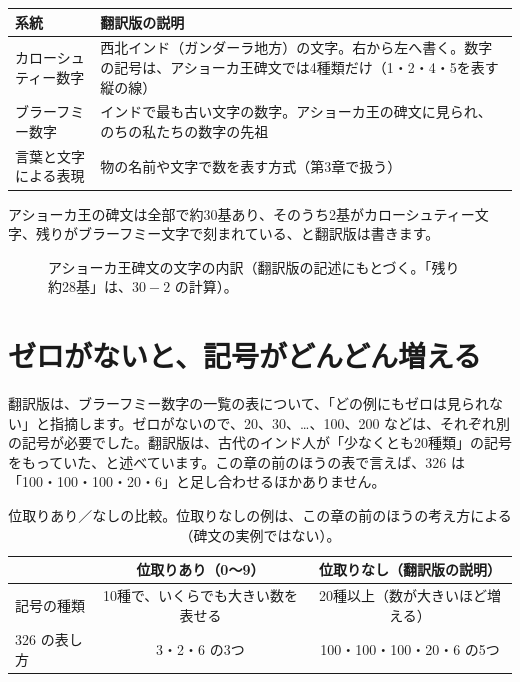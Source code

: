 \documentclass[a4paper,11pt,openany]{ltjsbook}
\begin{document}
\begin{center}
\begin{tabular}{lp{7.2cm}}
\toprule
系統 & 翻訳版の説明\\
\midrule
カローシュティー数字 & 西北インド（ガンダーラ地方）の文字。右から左へ書く。数字の記号は、アショーカ王碑文では4種類だけ（1・2・4・5を表す縦の線）\\
ブラーフミー数字 & インドで最も古い文字の数字。アショーカ王の碑文に見られ、のちの私たちの数字の先祖\\
言葉と文字による表現 & 物の名前や文字で数を表す方式（第3章で扱う）\\
\bottomrule
\end{tabular}
\end{center}

アショーカ王の碑文は全部で約30基あり、そのうち2基がカローシュティー文字、残りがブラーフミー文字で刻まれている、と翻訳版は書きます。

\begin{figure}[htbp]
\centering
{}
\caption{アショーカ王碑文の文字の内訳（翻訳版の記述にもとづく。「残り約28基」は、$30-2$ の計算）。}
\end{figure}

\section{ゼロがないと、記号がどんどん増える}

翻訳版は、ブラーフミー数字の一覧の表について、「どの例にもゼロは見られない」と指摘します。ゼロがないので、20、30、…、100、200 などは、それぞれ別の記号が必要でした。翻訳版は、古代のインド人が「少なくとも20種類」の記号をもっていた、と述べています。この章の前のほうの表で言えば、$326$ は「100・100・100・20・6」と足し合わせるほかありません。

\begin{table}[htbp]
\centering
\begin{tabular}{lcc}
\toprule
 & 位取りあり（0〜9） & 位取りなし（翻訳版の説明）\\
\midrule
記号の種類 & 10種で、いくらでも大きい数を表せる & 20種以上（数が大きいほど増える）\\
$326$ の表し方 & 3・2・6 の3つ & 100・100・100・20・6 の5つ\\
\bottomrule
\end{tabular}
\caption{位取りあり／なしの比較。位取りなしの例は、この章の前のほうの考え方による（碑文の実例ではない）。}
\end{table}
\end{document}
